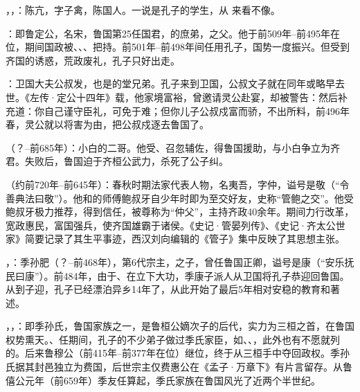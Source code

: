，，：陈亢，字子禽，陈国人。一说是孔子的学生，从  来看不像。

：即鲁定公，名宋，鲁国第25任国君，的庶弟，之父。他于前509年--前495年在位，期间国政被、、、把持。前501年--前498年间任用孔子，国势一度振兴。但受到齐国的诱惑，荒政废礼，孔子只好出走。

：卫国大夫公叔发，也是的堂兄弟。孔子来到卫国，公叔文子就在同年或略早去世。《左传·定公十四年》载，他家境富裕，曾邀请灵公赴宴，却被警告：然后补充道：你自己谨守臣礼，可免于难；但你儿子公叔戍富而骄，不出所料，前496年春，灵公就以将害为由，把公叔戍逐去鲁国了。

（？--前685年）：小白的二哥。他受、召忽辅佐，得鲁国援助，与小白争立为齐君。失败后，鲁国迫于齐桓公武力，杀死了公子纠。

（约前720年--前645年）：春秋时期法家代表人物，名夷吾，字仲，谥号是敬（“令善典法曰敬”）。他和的师傅鲍叔牙自少年时即为至交好友，史称“管鲍之交”。他受鲍叔牙极力推荐，得到信任，被尊称为“仲父”，主持齐政40余年。期间力行改革，宽政惠民，富国强兵，使齐国雄霸于诸侯。《史记·管晏列传》、《史记·齐太公世家》简要记录了其生平事迹，西汉刘向编辑的《管子》集中反映了其思想主张。%

，：季孙肥（？--前468年），第6代宗主，之子，曾任鲁国正卿，谥号是康（“安乐抚民曰康”）。前484年，由于、在立下大功，季康子派人从卫国将孔子恭迎回鲁国。从到子迎，孔子已经漂泊异乡14年了，从此开始了最后5年相对安稳的教育和著述。

，，：即季孙氏，鲁国家族之一，是鲁桓公嫡次子的后代，实力为三桓之首，在鲁国权势熏天。、任期间，孔子的不少弟子做过季氏家臣，如、、，此外也有不愿就列的。后来鲁穆公（前415年--前377年在位）继位，终于从三桓手中夺回政权。季孙氏据其封邑独立为费国，后世宗主仅费惠公在《孟子·万章下》有片言留存。从鲁僖公元年（前659年）季友任算起，季氏家族在鲁国风光了近两个半世纪。

